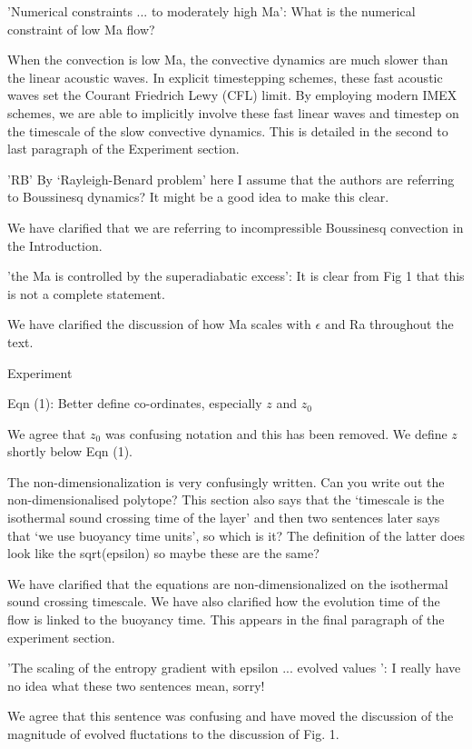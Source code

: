 \documentclass[aps, 11pt, singlecolumn]{revtex4-1} %
\begin{document}
\begin{singlespace}
\begin{myquotation}
'Numerical constraints ... to moderately high Ma': What is the
numerical constraint of low Ma flow?
\end{myquotation}
When the convection is low Ma, the convective dynamics are much slower
than the linear acoustic waves.  In explicit timestepping schemes, these
fast acoustic waves set the Courant Friedrich Lewy (CFL) limit.
By employing modern IMEX schemes, we are able to implicitly involve these
fast linear waves and timestep on the timescale of the slow convective
dynamics.    This is detailed in the second to
last paragraph of the Experiment section.

\begin{myquotation}
'RB' By `Rayleigh-Benard problem' here I assume that the
authors are referring to Boussinesq dynamics? It might be a good idea
to make this clear.
\end{myquotation}
We have clarified that we are referring to incompressible Boussinesq convection
in the Introduction.

\begin{myquotation}
'the Ma is controlled by the superadiabatic excess': It is clear
from Fig 1 that this is not a complete statement.
\end{myquotation}
We have clarified the discussion of how Ma scales with $\epsilon$ and
Ra throughout the text.

\begin{myquotation}
Experiment

Eqn (1): Better define co-ordinates, especially $z$ and $z_0$
\end{myquotation}
We agree that $z_0$ was confusing notation and this has been removed.  
We define $z$ shortly below Eqn (1).

\begin{myquotation}
The non-dimensionalization is very confusingly written. Can you write
out the non-dimensionalised polytope? This section also says that the
`timescale is the isothermal sound crossing time of the layer'
and then two sentences later says that `we use buoyancy time
units', so which is it? The definition of the latter does look like
the sqrt(epsilon) so maybe these are the same?
\end{myquotation}
We have clarified that the equations are non-dimensionalized on
the isothermal sound crossing timescale.  We have also clarified
how the evolution time of the flow is linked to the buoyancy time.
This appears in the final paragraph of the experiment section.

\begin{myquotation}
'The scaling of the entropy gradient with epsilon ... evolved
values ': I really have no idea what these two sentences mean,
sorry!
\end{myquotation}
We agree that this sentence was confusing and have moved the
discussion of the magnitude of evolved fluctations to the
discussion of Fig. 1.


\end{singlespace}
\end{document}
